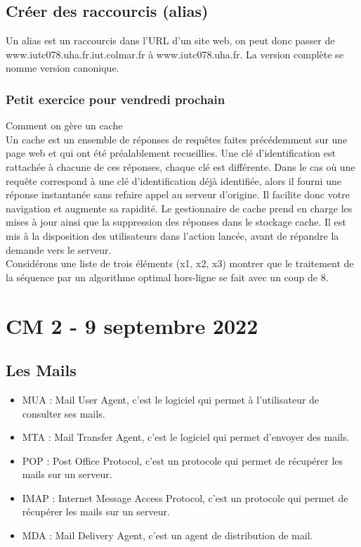 \documentclass[12pt, a4paper]{article}
\begin{document}
\subsection{Créer des raccourcis (alias)}
Un alias est un raccourcis dans l'URL d'un site web, on peut donc passer de \\www.iutc078.uha.fr.iut.colmar.fr
à www.iutc078.uha.fr. La version complète se nomme version canonique.

\subsubsection{Petit exercice pour vendredi prochain}
Comment on gère un cache\\

Un cache est un ensemble de réponses de requêtes faites précédemment 
sur une page web et qui ont été préalablement recueillies. Une clé 
d’identification est rattachée à chacune de ces réponses, chaque clé est 
différente. Dans le cas où une requête correspond à une clé d’identification 
déjà identifiée, alors il fourni une réponse instantanée sans refaire appel 
au serveur d’origine. Il facilite donc votre navigation et augmente sa rapidité.
Le gestionnaire de cache prend en charge les mises à jour ainsi que la 
suppression des réponses dans le stockage cache. Il est mis à la disposition 
des utilisateurs dans l’action lancée, avant de répandre la demande vers le 
serveur.\\

Considérons une liste de trois éléments (x1, x2, x3) montrer que le traitement de la 
séquence par un algorithme optimal hors-ligne se fait avec un coup de 8.

\newpage

\section{CM 2 - 9 septembre 2022}
    \subsection{Les Mails}
    \begin{itemize}
        \item  MUA : Mail User Agent, c'est le logiciel qui permet à l'utilisateur de consulter ses mails.
        \item  MTA : Mail Transfer Agent, c'est le logiciel qui permet d'envoyer des mails.
        \item POP : Post Office Protocol, c'est un protocole qui permet de récupérer les mails sur un serveur.
        \item IMAP : Internet Message Access Protocol, c'est un protocole qui permet de récupérer les mails sur un serveur.
        \item MDA : Mail Delivery Agent, c'est un agent de distribution de mail.
    \end{itemize}
\end{document}
